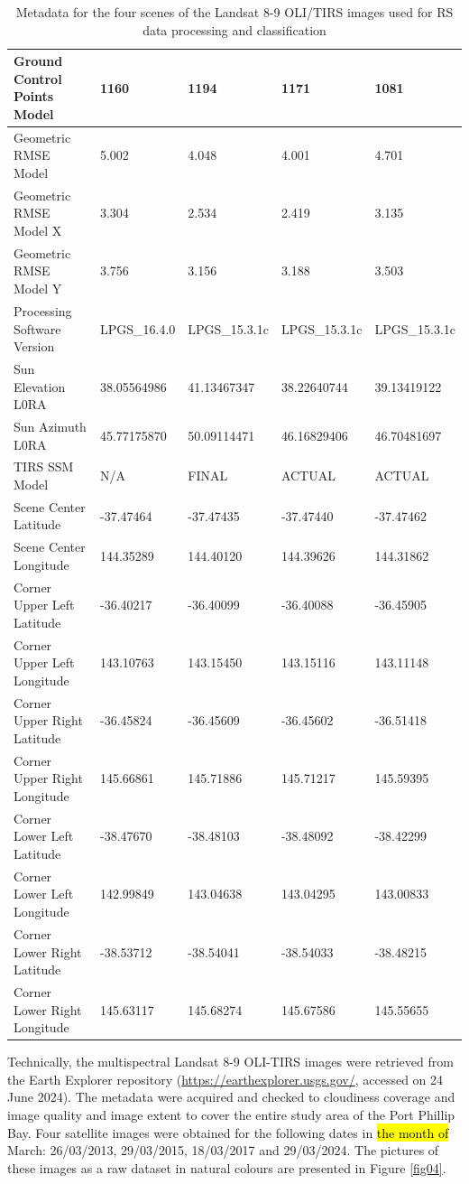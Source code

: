 \documentclass[jmse,article,submit,pdftex,moreauthors]{Definitions/mdpi}
\begin{document}
\begin{table}
{\begin{tabular}{|l|l|l|l|l|}
        Ground Control Points Model & 1160 & 1194 & 1171 & 1081 \\ \hline
        Geometric RMSE Model & 5.002 & 4.048 & 4.001 & 4.701 \\ \hline
        Geometric RMSE Model X & 3.304 & 2.534 & 2.419 & 3.135 \\ \hline
        Geometric RMSE Model Y & 3.756 & 3.156 & 3.188 & 3.503 \\ \hline
        Processing Software Version & LPGS\_16.4.0 & LPGS\_15.3.1c & LPGS\_15.3.1c & LPGS\_15.3.1c \\ \hline
        Sun Elevation L0RA & 38.05564986 & 41.13467347 & 38.22640744 & 39.13419122 \\ \hline
        Sun Azimuth L0RA & 45.77175870 & 50.09114471 & 46.16829406 & 46.70481697 \\ \hline
        TIRS SSM Model & N/A & FINAL & ACTUAL & ACTUAL \\ \hline
        Scene Center Latitude & -37.47464 & -37.47435 & -37.47440 & -37.47462 \\ \hline
        Scene Center Longitude & 144.35289 & 144.40120 & 144.39626 & 144.31862 \\ \hline
        Corner Upper Left Latitude & -36.40217 & -36.40099 & -36.40088 & -36.45905 \\ \hline
        Corner Upper Left Longitude & 143.10763 & 143.15450 & 143.15116 & 143.11148 \\ \hline
        Corner Upper Right Latitude & -36.45824 & -36.45609 & -36.45602 & -36.51418 \\ \hline
        Corner Upper Right Longitude & 145.66861 & 145.71886 & 145.71217 & 145.59395 \\ \hline
        Corner Lower Left Latitude & -38.47670 & -38.48103 & -38.48092 & -38.42299 \\ \hline
        Corner Lower Left Longitude & 142.99849 & 143.04638 & 143.04295 & 143.00833 \\ \hline
        Corner Lower Right Latitude & -38.53712 & -38.54041 & -38.54033 & -38.48215 \\ \hline
        Corner Lower Right Longitude & 145.63117 & 145.68274 & 145.67586 & 145.55655 \\ \hline
    \end{tabular}
    }
\caption{Metadata for the four scenes of the Landsat 8-9 OLI/TIRS images used for RS data processing and classification}
\label{tab01}
\end{table}

Technically, the multispectral Landsat 8-9 OLI-TIRS images were retrieved from the Earth Explorer repository (\href{https://earthexplorer.usgs.gov/}{https://earthexplorer.usgs.gov/}, accessed on 24 June 2024). The metadata were acquired and checked to cloudiness coverage and image quality and image extent to cover the entire study area of the Port Phillip Bay. Four satellite images were obtained for the following dates in \hl{the month of }March: 26/03/2013, 29/03/2015, 18/03/2017 and 29/03/2024. The pictures of these images as a raw dataset in natural colours are presented in Figure \ref{fig04}.
\end{document}
